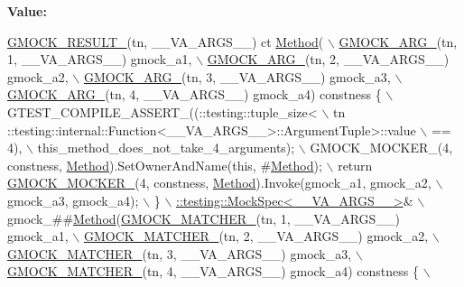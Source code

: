 {\bfseries Value\+:}
\begin{DoxyCode}
\hyperlink{gmock-generated-function-mockers_8h_a0e9d94e9c77df84f1103af06feee1077}{GMOCK\_RESULT\_}(tn, \_\_VA\_ARGS\_\_) ct \hyperlink{gmock-spec-builders__test_8cc_a95606368148f3e5aab5db46c32466afd}{Method}( \(\backslash\)
      \hyperlink{gmock-generated-function-mockers_8h_a887575cc1c31158fba808180a10c004f}{GMOCK\_ARG\_}(tn, 1, \_\_VA\_ARGS\_\_) gmock\_a1, \(\backslash\)
      \hyperlink{gmock-generated-function-mockers_8h_a887575cc1c31158fba808180a10c004f}{GMOCK\_ARG\_}(tn, 2, \_\_VA\_ARGS\_\_) gmock\_a2, \(\backslash\)
      \hyperlink{gmock-generated-function-mockers_8h_a887575cc1c31158fba808180a10c004f}{GMOCK\_ARG\_}(tn, 3, \_\_VA\_ARGS\_\_) gmock\_a3, \(\backslash\)
      \hyperlink{gmock-generated-function-mockers_8h_a887575cc1c31158fba808180a10c004f}{GMOCK\_ARG\_}(tn, 4, \_\_VA\_ARGS\_\_) gmock\_a4) constness \{ \(\backslash\)
    GTEST\_COMPILE\_ASSERT\_((::testing::tuple\_size<                          \(\backslash\)
        tn ::testing::internal::Function<\_\_VA\_ARGS\_\_>::ArgumentTuple>::value \(\backslash\)
            == 4), \(\backslash\)
        this\_method\_does\_not\_take\_4\_arguments); \(\backslash\)
    GMOCK\_MOCKER\_(4, constness, \hyperlink{gmock-spec-builders__test_8cc_a95606368148f3e5aab5db46c32466afd}{Method}).SetOwnerAndName(\textcolor{keyword}{this}, #\hyperlink{gmock-spec-builders__test_8cc_a95606368148f3e5aab5db46c32466afd}{Method}); \(\backslash\)
    return \hyperlink{gmock-generated-function-mockers_8h_a7d362499e27b1bc3a9806dd3cf58a5b7}{GMOCK\_MOCKER\_}(4, constness, \hyperlink{gmock-spec-builders__test_8cc_a95606368148f3e5aab5db46c32466afd}{Method}).Invoke(gmock\_a1, gmock\_a2, \(\backslash\)
        gmock\_a3, gmock\_a4); \(\backslash\)
  \} \(\backslash\)
  \hyperlink{classtesting_1_1internal_1_1_mock_spec}{::testing::MockSpec<\_\_VA\_ARGS\_\_>}& \(\backslash\)
      gmock\_##\hyperlink{gmock-spec-builders__test_8cc_a95606368148f3e5aab5db46c32466afd}{Method}(\hyperlink{gmock-generated-function-mockers_8h_aa87d0009fe91f1c89d658776b55a769c}{GMOCK\_MATCHER\_}(tn, 1, \_\_VA\_ARGS\_\_) gmock\_a1, \(\backslash\)
                     \hyperlink{gmock-generated-function-mockers_8h_aa87d0009fe91f1c89d658776b55a769c}{GMOCK\_MATCHER\_}(tn, 2, \_\_VA\_ARGS\_\_) gmock\_a2, \(\backslash\)
                     \hyperlink{gmock-generated-function-mockers_8h_aa87d0009fe91f1c89d658776b55a769c}{GMOCK\_MATCHER\_}(tn, 3, \_\_VA\_ARGS\_\_) gmock\_a3, \(\backslash\)
                     \hyperlink{gmock-generated-function-mockers_8h_aa87d0009fe91f1c89d658776b55a769c}{GMOCK\_MATCHER\_}(tn, 4, \_\_VA\_ARGS\_\_) gmock\_a4) constness \{ \(\backslash\)

\end{DoxyCode}
